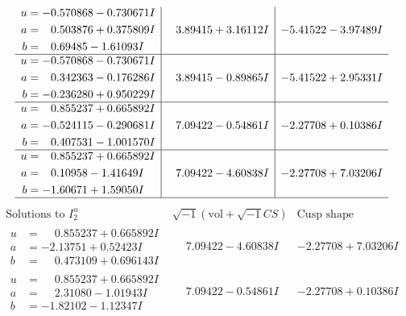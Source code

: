 \documentclass[1p]{elsarticle_modified}
\theoremstyle{definition}
\newcommand{\I}{\sqrt{-1}}
\begin{document}
$$\begin{array}{c|c|c}
\begin{aligned}
u &= -0.570868 - 0.730671 I \\
a &= \phantom{-}0.503876 + 0.375809 I \\
b &= \phantom{-}0.69485 - 1.61093 I\end{aligned}
 & \phantom{-}3.89415 + 3.16112 I & -5.41522 - 3.97489 I \\ \hline\begin{aligned}
u &= -0.570868 - 0.730671 I \\
a &= \phantom{-}0.342363 - 0.176286 I \\
b &= -0.236280 + 0.950229 I\end{aligned}
 & \phantom{-}3.89415 - 0.89865 I & -5.41522 + 2.95331 I \\ \hline\begin{aligned}
u &= \phantom{-}0.855237 + 0.665892 I \\
a &= -0.524115 - 0.290681 I \\
b &= \phantom{-}0.407531 - 1.001570 I\end{aligned}
 & \phantom{-}7.09422 - 0.54861 I & -2.27708 + 0.10386 I \\ \hline\begin{aligned}
u &= \phantom{-}0.855237 + 0.665892 I \\
a &= \phantom{-}0.10958 - 1.41649 I \\
b &= -1.60671 + 1.59050 I\end{aligned}
 & \phantom{-}7.09422 - 4.60838 I & -2.27708 + 7.03206 I\\
 \hline 
 \end{array}$$\newpage$$\begin{array}{c|c|c}  
\text{Solutions to }I^u_{2}& \I (\text{vol} + \sqrt{-1}CS) & \text{Cusp shape}\\
 \hline 
\begin{aligned}
u &= \phantom{-}0.855237 + 0.665892 I \\
a &= -2.13751 + 0.52423 I \\
b &= \phantom{-}0.473109 + 0.696143 I\end{aligned}
 & \phantom{-}7.09422 - 4.60838 I & -2.27708 + 7.03206 I \\ \hline\begin{aligned}
u &= \phantom{-}0.855237 + 0.665892 I \\
a &= \phantom{-}2.31080 - 1.01943 I \\
b &= -1.82102 - 1.12347 I\end{aligned}
 & \phantom{-}7.09422 - 0.54861 I & -2.27708 + 0.10386 I \\ \hline\begin{aligned}

\end{aligned}
\end{array}$$
\end{document}
